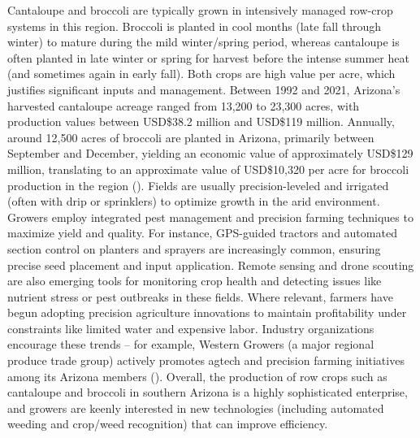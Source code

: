 \documentclass[letterpaper]{report}
\begin{document}
Cantaloupe and broccoli are typically grown in intensively managed row-crop systems in this region. Broccoli is planted in cool months (late fall through winter) to mature during the mild winter/spring period, whereas cantaloupe is often planted in late winter or spring for harvest before the intense summer heat (and sometimes again in early fall). Both crops are high value per acre, which justifies significant inputs and management. Between 1992 and 2021, Arizona's harvested cantaloupe acreage ranged from 13,200 to 23,300 acres, with production values between USD\$38.2 million and USD\$119 million. Annually, around 12,500 acres of broccoli are planted in Arizona, primarily between September and December, yielding an economic value of approximately USD\$129 million, translating to an approximate value of USD\$10,320 per acre for broccoli production in the region (\cite{YCEDA2024-rt}). Fields are usually precision-leveled and irrigated (often with drip or sprinklers) to optimize growth in the arid environment. Growers employ integrated pest management and precision farming techniques to maximize yield and quality. For instance, GPS-guided tractors and automated section control on planters and sprayers are increasingly common, ensuring precise seed placement and input application. Remote sensing and drone scouting are also emerging tools for monitoring crop health and detecting issues like nutrient stress or pest outbreaks in these fields. Where relevant, farmers have begun adopting precision agriculture innovations to maintain profitability under constraints like limited water and expensive labor. Industry organizations encourage these trends – for example, Western Growers (a major regional produce trade group) actively promotes agtech and precision farming initiatives among its Arizona members (\cite{Arizona-Department-of-Agriculture2018-dx}). Overall, the production of row crops such as cantaloupe and broccoli in southern Arizona is a highly sophisticated enterprise, and growers are keenly interested in new technologies (including automated weeding and crop/weed recognition) that can improve efficiency.
\end{document}
